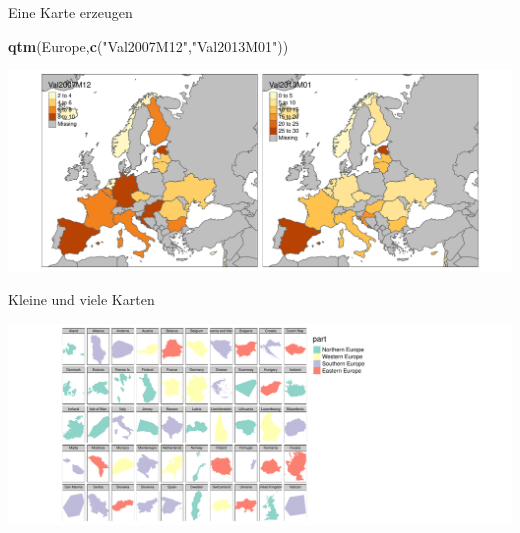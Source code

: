 \documentclass[ignorenonframetext,]{beamer}
\newenvironment{Shaded}{\begin{snugshade}}{\end{snugshade}}
\newcommand{\KeywordTok}[1]{\textcolor[rgb]{0.13,0.29,0.53}{\textbf{#1}}}
\newcommand{\DataTypeTok}[1]{\textcolor[rgb]{0.13,0.29,0.53}{#1}}
\newcommand{\DecValTok}[1]{\textcolor[rgb]{0.00,0.00,0.81}{#1}}
\newcommand{\StringTok}[1]{\textcolor[rgb]{0.31,0.60,0.02}{#1}}
\newcommand{\OtherTok}[1]{\textcolor[rgb]{0.56,0.35,0.01}{#1}}
\newcommand{\OperatorTok}[1]{\textcolor[rgb]{0.81,0.36,0.00}{\textbf{#1}}}
\newcommand{\NormalTok}[1]{#1}
\begin{document}
\begin{frame}[fragile]{Eine Karte erzeugen}

\begin{Shaded}
\begin{Highlighting}[]
\KeywordTok{qtm}\NormalTok{(Europe,}\KeywordTok{c}\NormalTok{(}\StringTok{"Val2007M12"}\NormalTok{,}\StringTok{"Val2013M01"}\NormalTok{))}
\end{Highlighting}
\end{Shaded}

\includegraphics{slides_all2gether_part1_files/figure-beamer/unnamed-chunk-95-1.pdf}

\end{frame}

\begin{frame}[fragile]{Kleine und viele Karten}

\begin{Shaded}
\end{Shaded}

\includegraphics{slides_all2gether_part1_files/figure-beamer/unnamed-chunk-97-1.pdf}

\end{frame}
\end{document}
